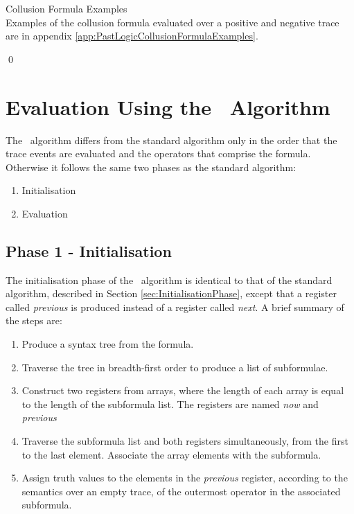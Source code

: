 \begin{myEx} Collusion Formula Examples\\

Examples of the collusion formula evaluated over a positive and negative trace are in appendix \ref{app:PastLogicCollusionFormulaExamples}.

\qed
\end{myEx}

\newpage
\section{Evaluation Using the \RRH\ Algorithm}
\label{sec:EvaluationUsingRRH}

The \RRH\ algorithm differs from the standard algorithm only in the order that the trace events are evaluated and the operators that comprise the formula.  Otherwise it follows the same two phases as the standard algorithm:

\begin{enumerate}
\item Initialisation
\item Evaluation
\end{enumerate}

\subsection{Phase 1 - Initialisation}
\label{sec:Initialisation}

The initialisation phase of the \RRH\ algorithm is identical to that of the standard algorithm, described in Section \ref{sec:InitialisationPhase}, except that a register called \textit{previous} is produced instead of a register called \textit{next}.  A brief summary of the steps are:

\begin{enumerate}
\item Produce a syntax tree from the formula.
\item Traverse the tree in breadth-first order to produce a list of subformulae.
\item Construct two registers from arrays, where the length of each array is equal to the length of the subformula list.  The registers are named \textit{now} and \textit{previous}
\item Traverse the subformula list and both registers simultaneously, from the first to the last element.  Associate the array elements with the subformula.
\item Assign truth values to the elements in the \textit{previous} register, according to the semantics over an empty trace, of the outermost operator in the associated subformula.
\end{enumerate}

